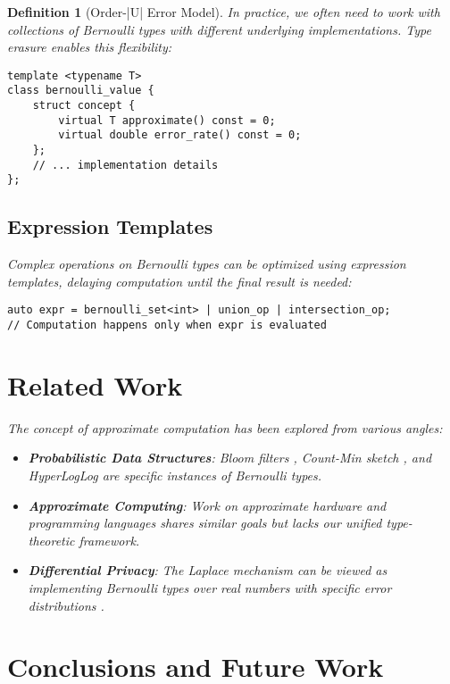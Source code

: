 \documentclass[11pt,final,hidelinks]{article}
\newtheorem{definition}[theorem]{Definition}
\begin{document}
\begin{definition}[Order-|U| Error Model]
In practice, we often need to work with collections of Bernoulli types with different underlying implementations. Type erasure enables this flexibility:

\begin{verbatim}
template <typename T>
class bernoulli_value {
    struct concept { 
        virtual T approximate() const = 0;
        virtual double error_rate() const = 0;
    };
    // ... implementation details
};
\end{verbatim}

\subsection{Expression Templates}

Complex operations on Bernoulli types can be optimized using expression templates, delaying computation until the final result is needed:

\begin{verbatim}
auto expr = bernoulli_set<int> | union_op | intersection_op;
// Computation happens only when expr is evaluated
\end{verbatim}

\section{Related Work}

The concept of approximate computation has been explored from various angles:
\begin{itemize}
    \item \textbf{Probabilistic Data Structures}: Bloom filters \cite{bloom1970}, Count-Min sketch \cite{cormode2005}, and HyperLogLog \cite{flajolet2007} are specific instances of Bernoulli types.
    \item \textbf{Approximate Computing}: Work on approximate hardware \cite{han2013} and programming languages \cite{sampson2011} shares similar goals but lacks our unified type-theoretic framework.
    \item \textbf{Differential Privacy}: The Laplace mechanism can be viewed as implementing Bernoulli types over real numbers with specific error distributions \cite{dwork2006}.
\end{itemize}

\section{Conclusions and Future Work}


\end{definition}
\end{document}
